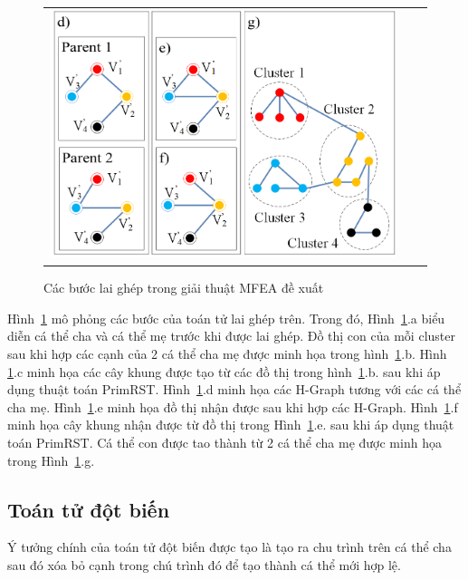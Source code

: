 \begin{figure}[tb]
\begin{tabular}{ccc}
		\includegraphics[scale=\scalefigure]{Pictures/Crossover/Crossover_New_d_e_f_g.png}\\
	\end{tabular}
	\centering
	\caption{Các bước lai ghép trong giải thuật MFEA đề xuất}
	\label{fig:Steps_of_novel_crossover_operator}
\end{figure}

Hình~\ref{fig:Steps_of_novel_crossover_operator} mô phỏng các bước của toán tử lai ghép trên. Trong đó,  Hình~\ref{fig:Steps_of_novel_crossover_operator}.a biểu diễn cá thể cha và cá thể mẹ trước khi được lai ghép. Đồ thị con của mỗi cluster sau khi hợp các cạnh của 2 cá thể cha mẹ được minh họa trong hình~\ref{fig:Steps_of_novel_crossover_operator}.b. Hình \ref{fig:Steps_of_novel_crossover_operator}.c minh họa các cây khung được tạo từ các đồ thị trong hình~\ref{fig:Steps_of_novel_crossover_operator}.b. sau khi áp dụng thuật toán PrimRST. Hình~\ref{fig:Steps_of_novel_crossover_operator}.d minh họa các H-Graph tương với các cá thể cha mẹ. Hình~\ref{fig:Steps_of_novel_crossover_operator}.e minh họa đồ thị nhận được sau khi hợp các H-Graph. Hình~\ref{fig:Steps_of_novel_crossover_operator}.f minh họa cây khung nhận được từ đồ thị trong Hình~\ref{fig:Steps_of_novel_crossover_operator}.e. sau khi áp dụng thuật toán PrimRST. Cá thể con được tao thành từ 2 cá thể cha mẹ được minh họa trong Hình~\ref{fig:Steps_of_novel_crossover_operator}.g.


\subsection{Toán tử đột biến} \label{chap_coso:sec_mfea:subsec:toantudotbien}
Ý tưởng chính của toán tử đột biến được tạo là tạo ra chu trình trên cá thể cha sau đó xóa bỏ cạnh trong chú trình đó để tạo thành cá thể mới hợp lệ.

